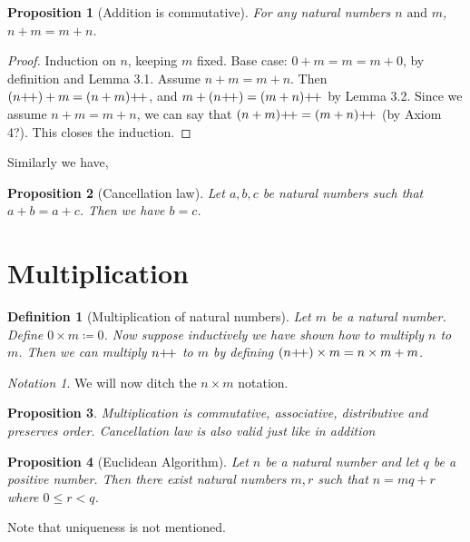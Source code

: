 \documentclass[12pt]{article}
\newtheorem{proposition}{Proposition}[section]
\newtheorem{definition}{Definition}[section]
\theoremstyle{remark}
\newtheorem*{notation}{Notation}
\begin{document}
\begin{proposition}[Addition is commutative]
	For any natural numbers $ n \text{ and } m $, $ n+m = m+n $.
\end{proposition}

\begin{proof}
    Induction on $ n $, keeping $ m $ fixed. Base case: $ 0+m = m = m+0 $, by definition and Lemma 3.1. Assume $ n+m = m+n $. Then $ (n\inc) + m = (n+m)\inc $, and $ m+(n\inc) = (m+n)\inc $ by Lemma 3.2. Since we assume $n+m = m+n$, we can say that $ (n+m)\inc = (m+n)\inc $ (by Axiom 4?). This closes the induction.
\end{proof}

Similarly we have, 

\begin{proposition}[Cancellation law]
    Let $ a, b, c $ be natural numbers such that $ a+b=a+c $. Then we have $ b=c $.
\end{proposition}

\section{Multiplication}%
\label{sec:Multiplication}

\begin{definition}[Multiplication of natural numbers]
	Let $ m $ be a natural number. Define $ 0 \times m \coloneqq 0 $. Now suppose inductively we have shown how to multiply $ n $ to $ m $. Then we can multiply $ n\inc $ to $ m $ by defining $ (n\inc) \times m = n \times m + m $.
\end{definition}

\begin{notation}
	We will now ditch the $ n \times m $ notation. 
\end{notation}

\begin{proposition}
    Multiplication is commutative, associative, distributive and preserves order. Cancellation law is also valid just like in addition
\end{proposition}

\begin{proposition}[Euclidean Algorithm]
    Let $ n $ be a natural number and let $ q $ be a positive number. Then there exist natural numbers $ m, r $ such that $ n = mq + r $ where $ 0 \leq r < q $.
\end{proposition}

Note that uniqueness is not mentioned. 
\end{document}
